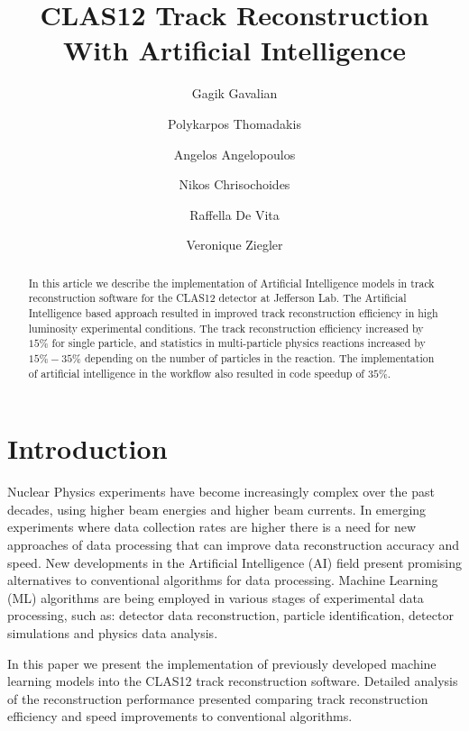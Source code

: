\documentclass[preprint,12pt]{elsarticle}
\title{CLAS12 Track Reconstruction With Artificial Intelligence }
\author[1]{Gagik Gavalian}
\author[2]{Polykarpos Thomadakis }
\author[2]{Angelos Angelopoulos}
\author[2]{Nikos Chrisochoides}
\author[1]{Raffella De Vita}
\author[1]{Veronique Ziegler}
\begin{document}

\begin{abstract}

  In this article we describe the implementation of Artificial Intelligence models in track reconstruction software for the CLAS12 detector at Jefferson Lab.
 The Artificial Intelligence based approach resulted in improved track reconstruction efficiency in high luminosity experimental conditions.  The track
 reconstruction efficiency increased by $15\%$ for single particle, and statistics in multi-particle physics reactions increased by $15\%-35\%$ depending 
 on the number of particles in the reaction. The implementation of artificial intelligence in the workflow also resulted in code speedup of $35\%$.
\end{abstract}
\maketitle


\section{Introduction}
\indent

Nuclear Physics experiments have become increasingly complex over the past decades, using higher beam energies and higher beam currents. In emerging experiments where data collection rates are higher there is a need for new approaches of data processing that can improve data reconstruction accuracy and speed. New developments in the Artificial Intelligence (AI) field present promising alternatives to conventional algorithms for data processing. Machine Learning (ML) algorithms are being employed in various stages of experimental data processing, such as: detector data reconstruction, particle identification, detector simulations and physics data analysis. 

In this paper we present the implementation of previously developed machine learning models into the CLAS12 track reconstruction software. Detailed analysis 
of the reconstruction performance presented comparing track reconstruction efficiency and speed improvements to conventional algorithms.







\end{document}
